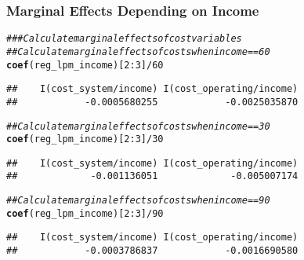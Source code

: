 \documentclass{beamer}\usepackage[]{graphicx}\usepackage[]{color}
\makeatletter
\newcommand{\hlnum}[1]{\textcolor[rgb]{0.686,0.059,0.569}{#1}}%
\newcommand{\hlcom}[1]{\textcolor[rgb]{0.678,0.584,0.686}{\textit{#1}}}%
\newcommand{\hlopt}[1]{\textcolor[rgb]{0,0,0}{#1}}%
\newcommand{\hlstd}[1]{\textcolor[rgb]{0.345,0.345,0.345}{#1}}%
\newcommand{\hlkwd}[1]{\textcolor[rgb]{0.737,0.353,0.396}{\textbf{#1}}}%
\newenvironment{kframe}{%
 \def\at@end@of@kframe{}%
 \ifinner\ifhmode%
  \def\at@end@of@kframe{\end{minipage}}%
  \begin{minipage}{\columnwidth}%
 \fi\fi%
 \def\FrameCommand##1{\hskip\@totalleftmargin \hskip-\fboxsep
 \colorbox{shadecolor}{##1}\hskip-\fboxsep
     \hskip-\linewidth \hskip-\@totalleftmargin \hskip\columnwidth}%
 \MakeFramed {\advance\hsize-\width
   \@totalleftmargin\z@ \linewidth\hsize
   \@setminipage}}%
 {\par\unskip\endMakeFramed%
 \at@end@of@kframe}
\newenvironment{knitrout}{}{} %
\makeatother
\begin{document}
\begin{frame}[fragile]\frametitle{Marginal Effects Depending on Income}
\begin{knitrout}\footnotesize
{}\color{fgcolor}\begin{kframe}
\begin{alltt}
\hlcom{### Calculate marginal effects of cost variables}
\hlcom{## Calculate marginal effects of costs when income == 60}
\hlkwd{coef}\hlstd{(reg_lpm_income)[}\hlnum{2}\hlopt{:}\hlnum{3}\hlstd{]} \hlopt{/} \hlnum{60}
\end{alltt}
\begin{verbatim}
##    I(cost_system/income) I(cost_operating/income) 
##            -0.0005680255            -0.0025035870
\end{verbatim}
\begin{alltt}
\hlcom{## Calculate marginal effects of costs when income == 30}
\hlkwd{coef}\hlstd{(reg_lpm_income)[}\hlnum{2}\hlopt{:}\hlnum{3}\hlstd{]} \hlopt{/} \hlnum{30}
\end{alltt}
\begin{verbatim}
##    I(cost_system/income) I(cost_operating/income) 
##             -0.001136051             -0.005007174
\end{verbatim}
\begin{alltt}
\hlcom{## Calculate marginal effects of costs when income == 90}
\hlkwd{coef}\hlstd{(reg_lpm_income)[}\hlnum{2}\hlopt{:}\hlnum{3}\hlstd{]} \hlopt{/} \hlnum{90}
\end{alltt}
\begin{verbatim}
##    I(cost_system/income) I(cost_operating/income) 
##            -0.0003786837            -0.0016690580
\end{verbatim}
\end{kframe}
\end{knitrout}
\end{frame}
\end{document}
